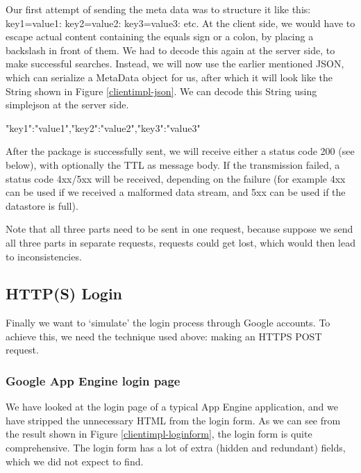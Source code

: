 Our first attempt of sending the meta data was to structure it like this:
key1=value1: key2=value2: key3=value3: etc. At the client side, we would have to
escape actual content containing the equals sign or a colon, by placing a
backslash in front of them. We had to decode this again at the server side, to
make successful searches. Instead, we will now use the earlier mentioned JSON,
which can serialize a MetaData object for us, after which it will look like the
String shown in Figure \ref{clientimpl-json}. We can decode this String using
simplejson at the server side.

\begin{figure*}[ht] %
\begin{center}
\begin{code}
{"key1":"value1","key2":"value2","key3":"value3"}
\end{code}
\caption{An example of a serial JSON object.\label{clientimpl-json}}
\end{center}
\end{figure*}

After the package is successfully sent, we will receive either a status code 200
(see below), with optionally the TTL as message body. If the transmission failed,
a status code 4xx/5xx will be received, depending on the failure (for example 4xx
can be used if we received a malformed data stream, and 5xx can be used if the
datastore is full).

Note that all three parts need to be sent in one request, because suppose we send
all three parts in separate requests, requests could get lost, which would then
lead to inconsistencies.

\subsection{HTTP(S) Login}
Finally we want to `simulate' the login process through Google accounts. To
achieve this, we need the technique used above: making an HTTPS POST request.

\subsubsection{Google App Engine login page}
We have looked at the login page of a typical App Engine application, and we
have stripped the unnecessary HTML from the login form. As we can see from the
result shown in Figure \ref{clientimpl-loginform}, the login form is quite
comprehensive. The login form has a lot of extra (hidden and redundant) fields,
which we did not expect to find.

